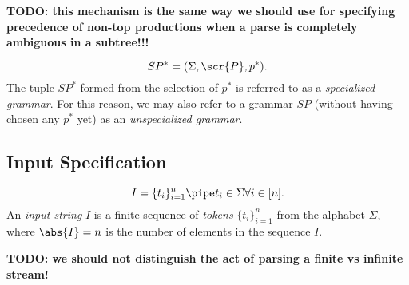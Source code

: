 \documentclass[10pt]{article}
\newcommand{\generalsubseq}{\overbar{I}}
\newcommand{\substringwith}[2]{\overbar{I}_{(#1,#2)}}
\newcommand{\canonicalleftend}{l_1}
\newcommand{\canonicalrightend}{l_2}
\newcommand{\canonicalsubstring}{\substringwith{\canonicalleftend}{\canonicalrightend}}
\newcommand{\bookmarkwith}[1]{\widehat{I}_{(#1)}}
\newcommand{\canonicalbookmarkindex}{l^+}
\newcommand{\canonicalbookmark}{\bookmarkwith{\canonicalbookmarkindex}}
\begin{document}
\textbf{TODO: this mechanism is the same way we should use for specifying precedence of non-top productions when a parse is completely ambiguous in a subtree!!!}

\begin{equation}
  \label{eq:specialized}
  SP^* = (\Sigma, \scr{P}, p^*).
\end{equation}
The tuple $SP^*$ formed from the selection of $p^*$ is referred to as a \textit{specialized grammar}. For this reason, we may also refer to a grammar $SP$ (without having chosen any $p^*$ yet) as an \textit{unspecialized grammar}.

\subsection{Input Specification}
\label{sec:input-specification}
\begin{equation}
  \label{eq:input-string-tokens}
  I = \{t_i\}_{i=1}^n \pipe t_i \in \Sigma \forall i \in [n].
\end{equation}
An \textit{input string} $I$ is a finite sequence of \textit{tokens} $\{t_i\}_{i=1}^n$ from the alphabet $\Sigma$, where $\abs{I} = n$ is the number of elements in the sequence $I$.

\textbf{TODO: we should not distinguish the act of parsing a finite vs infinite stream!}


\end{document}
